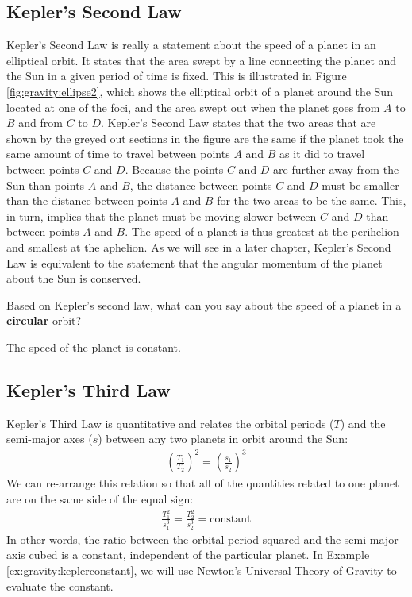 \subsection{Kepler's Second Law}
Kepler's Second Law is really a statement about the speed of a planet in an elliptical orbit. It states that the area swept by a line connecting the planet and the Sun in a given period of time is fixed. This is illustrated in Figure \ref{fig:gravity:ellipse2}, which shows the elliptical orbit of a planet around the Sun located at one of the foci, and the area swept out when the planet goes from $A$ to $B$ and from $C$ to $D$. 
Kepler's Second Law states that the two areas that are shown by the greyed out sections in the figure are the same if the planet took the same amount of time to travel between points $A$ and $B$ as it did to travel between points $C$ and $D$. Because the points $C$ and $D$ are further away from the Sun than points $A$ and $B$, the distance between points $C$ and $D$ must be smaller than the distance between points $A$ and $B$ for the two areas to be the same. This, in turn, implies that the planet must be moving slower between $C$ and $D$ than between points $A$ and $B$. The speed of a planet is thus greatest at the perihelion and smallest at the aphelion. As we will see in a later chapter, Kepler's Second Law is equivalent to the statement that the angular momentum of the planet about the Sun is conserved.

\begin{checkpoint}
Based on Kepler's second law, what can you say about the speed of a planet in a \textbf{circular} orbit? 
\begin{answer}
The speed of the planet is constant.
\end{answer}
\end{checkpoint} 

\subsection{Kepler's Third Law}
Kepler's Third Law is quantitative and relates the orbital periods ($T$) and the semi-major axes ($s$) between any two planets in orbit around the Sun:
\begin{align*}
\left(\frac{T_1}{T_2}\right)^2=\left(\frac{s_1}{s_2}\right)^3
\end{align*}
We can re-arrange this relation so that all of the quantities related to one planet are on the same side of the equal sign:
\begin{align*}
\frac{T_1^2}{s_1^3}=\frac{T_2^2}{s_2^3}=\text{constant}
\end{align*}
In other words, the ratio between the orbital period squared and the semi-major axis cubed is a constant, independent of the particular planet. In Example \ref{ex:gravity:keplerconstant}, we will use Newton's Universal Theory of Gravity to evaluate the constant.

